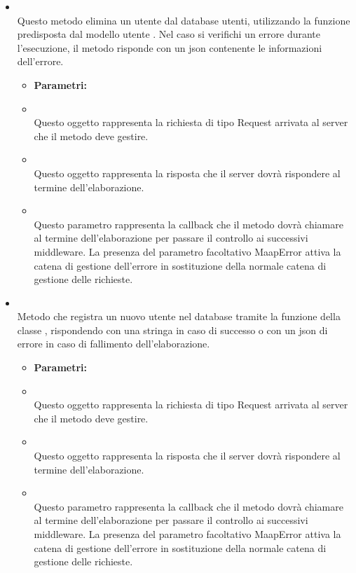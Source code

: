 \begin{itemize}
\item[] \textbf{} \\ Questo metodo elimina un utente dal database utenti, utilizzando la funzione predisposta dal modello utente . Nel caso si verifichi un errore durante l'esecuzione, il metodo risponde con un json contenente le informazioni dell'errore.
\begin{itemize}\addtolength{\itemsep}{-0.5\baselineskip}
\item[] \textbf{Parametri:}
\item[]  \\ Questo oggetto rappresenta la richiesta di tipo Request arrivata al server che il metodo deve gestire.
\item[]  \\ Questo oggetto rappresenta la risposta che il server dovrà rispondere al termine dell'elaborazione.
\item[]  \\ Questo parametro rappresenta la callback che il metodo dovrà chiamare al termine dell'elaborazione per passare il controllo ai successivi middleware. La presenza del parametro facoltativo MaapError attiva la catena di gestione dell'errore in sostituzione della normale catena di gestione delle richieste.
\end{itemize}
\item[] \textbf{} \\ Metodo che registra un nuovo utente nel database tramite la funzione  della classe , rispondendo con una stringa in caso di successo o con un json di errore in caso di fallimento dell'elaborazione.
\begin{itemize}\addtolength{\itemsep}{-0.5\baselineskip}
\item[] \textbf{Parametri:}
\item[]  \\ Questo oggetto rappresenta la richiesta di tipo Request arrivata al server che il metodo deve gestire.
\item[]  \\ Questo oggetto rappresenta la risposta che il server dovrà rispondere al termine dell'elaborazione.
\item[]  \\ Questo parametro rappresenta la callback che il metodo dovrà chiamare al termine dell'elaborazione per passare il controllo ai successivi middleware. La presenza del parametro facoltativo MaapError attiva la catena di gestione dell'errore in sostituzione della normale catena di gestione delle richieste.

\end{itemize}
\end{itemize}
